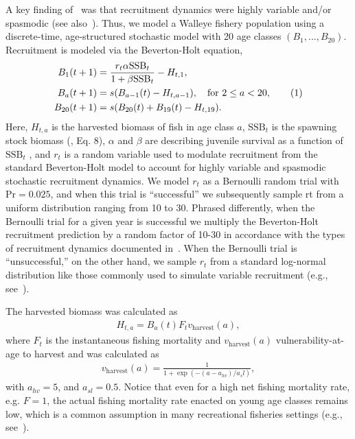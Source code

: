 \documentclass[floatfix,nofootinbib,longbibliography,notitlepage]{revtex4-2}
\newcommand\numberthis{\addtocounter{equation}{1}\tag{\theequation}}
\def\vharv{v_{\text{harvest}}}
\def\ssb{\text{SSB}}
\begin{document}
A key finding of~\cite{cahill2022} was that recruitment dynamics were highly variable and/or spasmodic (see also~\cite{caddy-gulland}). 
Thus, we model a Walleye fishery population using a discrete-time, age-structured stochastic model with 20 age classes $(B_1, ... ,B_{20})$. 
Recruitment is modeled via the Beverton-Holt equation,
\begin{align*}
    B_1(t+1) &= \frac{r_t \alpha\ssb_t}{1 + \beta \ssb_t} - H_{t,1},\\
    B_a(t+1) &= s (B_{a-1}(t) - H_{t,a-1}), \quad \text{for } 2 \leq a < 20, \numberthis\\
    B_{20}(t+1) &= s (B_{20}(t) + B_{19}(t) - H_{t,19}).
\end{align*}
Here, $H_{t,a}$ is the harvested biomass of fish in age class $a$, $\ssb_t$ is the spawning stock biomass (\cite{cahill2022}, Eq. 8), $\alpha$ and $\beta$ are describing juvenile survival as a function of $\ssb_t$ , and $r_t$ is a random variable used to modulate recruitment from the standard Beverton-Holt model to account for highly variable and spasmodic stochastic recruitment dynamics. 
We model $r_t$ as a Bernoulli random trial with $\text{Pr}=0.025$, and when this trial is “successful” we subsequently sample rt from a uniform distribution ranging from 10 to 30. 
Phrased differently, when the Bernoulli trial for a given year is successful we multiply the Beverton-Holt recruitment prediction by a random factor of 10-30 in accordance with the types of recruitment dynamics documented in~\cite{cahill2022}. 
When the Bernoulli trial is “unsuccessful,” on the other hand, we sample $r_t$ from a standard log-normal distribution like those commonly used to simulate variable recruitment (e.g., see~\cite{quinn-deriso}).

The harvested biomass was calculated as
\begin{align*}
    H_{t,a} = B_a(t) F_t \vharv(a),
\end{align*}
where $F_t$ is the instantaneous  fishing mortality and $\vharv(a)$ vulnerability-at-age to harvest and was calculated as
\begin{align}
    \vharv(a) = \frac1{1 + \exp(-(a-a_{hv})/a_sl)},
\end{align}
with $a_{hv}=5$, and $a_{sl}=0.5$. 
Notice that even for a high net fishing mortality rate, e.g. $F=1$, the actual fishing mortality rate enacted on young age classes remains low, which is a common assumption in many recreational fisheries settings (e.g., see~\cite{golden2022focusing}).
\end{document}
